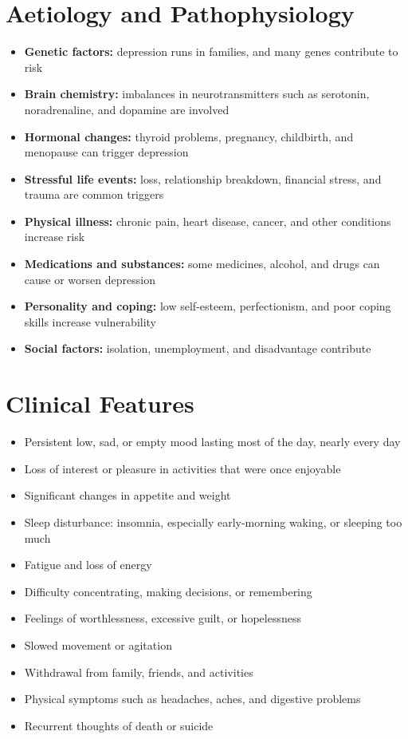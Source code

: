 \section*{Aetiology and Pathophysiology}
\begin{itemize}
    \item \textbf{Genetic factors:} depression runs in families, and many genes contribute to risk
    \item \textbf{Brain chemistry:} imbalances in neurotransmitters such as serotonin, noradrenaline, and dopamine are involved
    \item \textbf{Hormonal changes:} thyroid problems, pregnancy, childbirth, and menopause can trigger depression
    \item \textbf{Stressful life events:} loss, relationship breakdown, financial stress, and trauma are common triggers
    \item \textbf{Physical illness:} chronic pain, heart disease, cancer, and other conditions increase risk
    \item \textbf{Medications and substances:} some medicines, alcohol, and drugs can cause or worsen depression
    \item \textbf{Personality and coping:} low self-esteem, perfectionism, and poor coping skills increase vulnerability
    \item \textbf{Social factors:} isolation, unemployment, and disadvantage contribute
\end{itemize}

\section*{Clinical Features}
\begin{itemize}
    \item Persistent low, sad, or empty mood lasting most of the day, nearly every day
    \item Loss of interest or pleasure in activities that were once enjoyable
    \item Significant changes in appetite and weight
    \item Sleep disturbance: insomnia, especially early-morning waking, or sleeping too much
    \item Fatigue and loss of energy
    \item Difficulty concentrating, making decisions, or remembering
    \item Feelings of worthlessness, excessive guilt, or hopelessness
    \item Slowed movement or agitation
    \item Withdrawal from family, friends, and activities
    \item Physical symptoms such as headaches, aches, and digestive problems
    \item Recurrent thoughts of death or suicide
\end{itemize}

